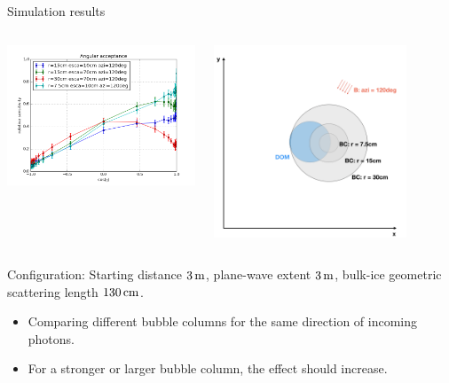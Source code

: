 \begin{frame}[fragile]{Simulation results}
  \begin{columns}
    \begin{column}{0.5\textwidth}
      \includegraphics[width=\textwidth]{img/summer_scenario_azi120deg}
    \end{column}
    \begin{column}{0.5\textwidth}
      \includegraphics[width=0.8\textwidth]{img/summerscenario-006}
    \end{column}
  \end{columns}

  \tiny Configuration: Starting distance $3\text{\,m}$, plane-wave extent $3\text{\,m}$, bulk-ice geometric scattering length $130\text{\,cm}$.
  \normalsize

  \begin{itemize}
    \item Comparing different bubble columns for the same direction of incoming photons.
    \item For a stronger or larger bubble column, the effect should increase. \checkmark
  \end{itemize}
\end{frame}

